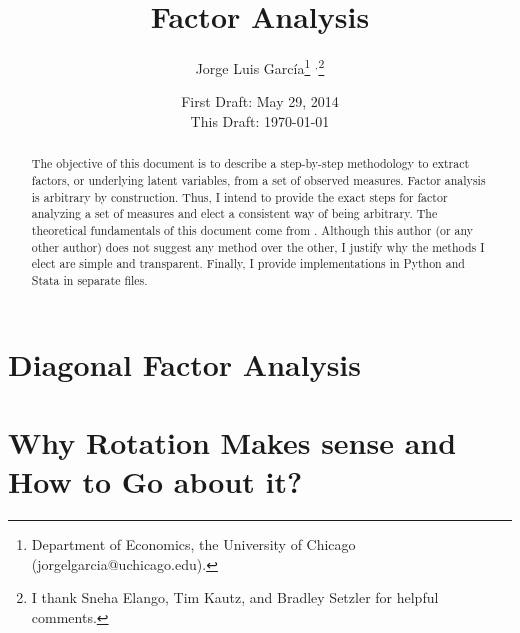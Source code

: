 



\title{Factor Analysis}
\author{Jorge Luis Garc\'{i}a\thanks{Department of Economics, the University of Chicago (jorgelgarcia@uchicago.edu).} $^{,}$\thanks{I thank Sneha Elango, Tim Kautz, and Bradley Setzler for helpful comments.}}
\date{First Draft: May 29, 2014 \\ This Draft: \today}
\maketitle


\begin{abstract}
\noindent The objective of this document is to describe a step-by-step methodology to extract factors, or underlying latent variables, from a set of observed measures. Factor analysis is arbitrary by construction. Thus, I intend to provide the exact steps for factor analyzing a set of measures and elect a consistent way of being arbitrary. The theoretical fundamentals of this document come from \citet{gorsuch1983factor}. Although this author (or any other author) does not suggest any method over the other, I justify why the methods I elect are simple and transparent. Finally, I provide implementations in Python and Stata in separate files.
\end{abstract}

\section{Diagonal Factor Analysis} \label{section:dfa}






\section{Why Rotation Makes sense and How to Go about it?} \label{section:rfa}






\clearpage

